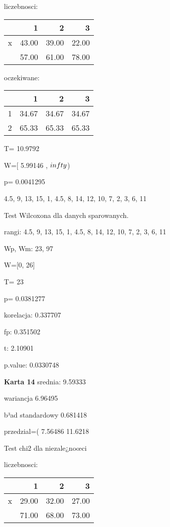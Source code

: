 \documentclass[a4paper,12pt]{article}
\begin{document}
\begin{multicols}{3}
   liczebnosci: %
\begin{tabular}{rrrr}
  \hline
 & 1 & 2 & 3 \\
  \hline
x & 43.00 & 39.00 & 22.00 \\
   & 57.00 & 61.00 & 78.00 \\
   \hline
\end{tabular}
 
   
   oczekiwane: %
\begin{tabular}{rrrr}
  \hline
 & 1 & 2 & 3 \\
  \hline
1 & 34.67 & 34.67 & 34.67 \\
  2 & 65.33 & 65.33 & 65.33 \\
   \hline
\end{tabular}
 
   
   T= 10.9792 
   
   W=[ 5.99146 , $\\infty$) 
   
   p= 0.0041295 \vspace{1cm} 

  4.5, 9, 13, 15, 1, 4.5, 8, 14, 12, 10, 7, 2, 3, 6, 11 

  Test Wilcoxona dla danych sparowanych. 
  
  rangi: 4.5, 9, 13, 15, 1, 4.5, 8, 14, 12, 10, 7, 2, 3, 6, 11 
  
  Wp, Wm:  23,  97 
  
  W=[0, 26]  
  
  T=  23 
  
  p= 0.0381277 \vspace{1cm} 

  korelacja: 0.337707
     
     fp: 0.351502
     
     t: 2.10901
     
     p.value: 0.0330748 \vspace{1cm} 

  \textbf{Karta  14 } 
 srednia: 9.59333 
     
     wariancja 6.96495  
     
     b³ad standardowy 0.681418 
     
     przedzial=( 7.56486 11.6218 \vspace{1cm} 

  Test chi2 dla niezale¿noœci 
   
   liczebnosci: %
\begin{tabular}{rrrr}
  \hline
 & 1 & 2 & 3 \\
  \hline
x & 29.00 & 32.00 & 27.00 \\
   & 71.00 & 68.00 & 73.00 \\
   \hline
\end{tabular}
 

\end{multicols}
\end{document}
